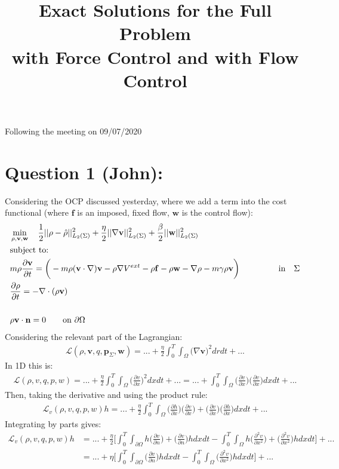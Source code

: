 \documentclass[11pt, a4paper]{article}
\title{Exact Solutions for the Full Problem \\with Force Control and with Flow Control}
\date{}
\theoremstyle{definition}
\newcommand{\Sta}{\rho}
\newcommand{\Stav}{\mathbf{v}}
\newcommand{\Adja}{\mathbf{p}_\Sigma}
\newcommand{\Adjb}{q}
\newcommand{\Con}{\mathbf{f}}
\begin{document}
Following the meeting on 09/07/2020	
\section{Question 1 (John):}
Considering the OCP discussed yesterday, where we add a term into the cost functional (where $\Con$ is an imposed, fixed flow, $\mathbf{w}$ is the control flow):
	\begin{align}
	&\min_{\Sta,\Stav,\mathbf{w}} \quad \frac{1}{2}|| \Sta - \hat \Sta ||_{L_2(\Sigma)}^2 + \frac{\eta}{2}||\nabla \Stav||_{L_2(\Sigma)}^2 +\frac{\beta}{2}||\mathbf{w}||_{L_2(\Sigma)}^2\\
	&\text{subject to:} \notag\\
	& m \Sta \frac{\partial \Stav}{\partial t} = \bigg(- m \Sta (\Stav \cdot \nabla)\Stav - \Sta \nabla V^{ext} - \Sta \Con - \Sta \mathbf{w} - \nabla \Sta - m \gamma \Sta \Stav\bigg) \ \ \ \qquad \ \ \quad\text{in} \quad \Sigma \notag\\
	&\frac{\partial \Sta}{\partial t} = - \nabla \cdot (\Sta \Stav) \notag\\
	 \notag\\
	&\Sta \Stav \cdot \mathbf{n} =0	\qquad\text{on } \partial \Omega \notag
	\end{align}
	Considering the relevant part of the Lagrangian:
	\begin{align*}
	\mathcal{L}(\Sta,\Stav, \Adjb, \Adja, \mathbf{w}) = ... + \frac{\eta}{2}\int_0^T \int_{\Omega} \bigg( \nabla \Stav \bigg)^2 dr dt + ...
	\end{align*}
	In 1D this is:
	\begin{align*}
	\mathcal{L}(\Sta,v, \Adjb, p, w) = ... + \frac{\eta}{2}\int_0^T \int_{\Omega} \bigg(\frac{\partial v}{\partial x} \bigg)^2 dx dt + ... = ... + \int_0^T \int_{\Omega} \bigg(\frac{\partial v}{\partial x} \bigg)\bigg(\frac{\partial v}{\partial x} \bigg) dx dt + ...
	\end{align*}
	Then, taking the derivative and using the product rule:
	\begin{align*}
	\mathcal{L}_v(\Sta,v, \Adjb, p, w)h = ... +\frac{\eta}{2} \int_0^T \int_{\Omega} \bigg(\frac{\partial h}{\partial x} \bigg)\bigg(\frac{\partial v}{\partial x} \bigg) + \bigg(\frac{\partial v}{\partial x} \bigg)\bigg(\frac{\partial h}{\partial x} \bigg) dx dt + ...
	\end{align*}
	Integrating by parts gives:
	\begin{align*}
	\mathcal{L}_v(\Sta,v, \Adjb, p, w)h &= ... +\frac{\eta}{2} \bigg[ 
	 \int_0^T \int_{\partial\Omega}  h\bigg(\frac{\partial v}{\partial n} \bigg) + \bigg(\frac{\partial v}{\partial n} \bigg)h dx dt	 
	- \int_0^T \int_{\Omega} h\bigg(\frac{\partial^2 v}{\partial x^2} \bigg) + \bigg(\frac{\partial^2 v}{\partial x^2} \bigg)h dx dt  \bigg]+ ...\\
	&= ... +\eta \bigg[ 
	\int_0^T \int_{\partial\Omega} \bigg(\frac{\partial v}{\partial n} \bigg)h dx dt	 
	- \int_0^T \int_{\Omega} \bigg(\frac{\partial^2 v}{\partial x^2} \bigg)h dx dt  \bigg]+ ...
	\end{align*}
\end{document}
